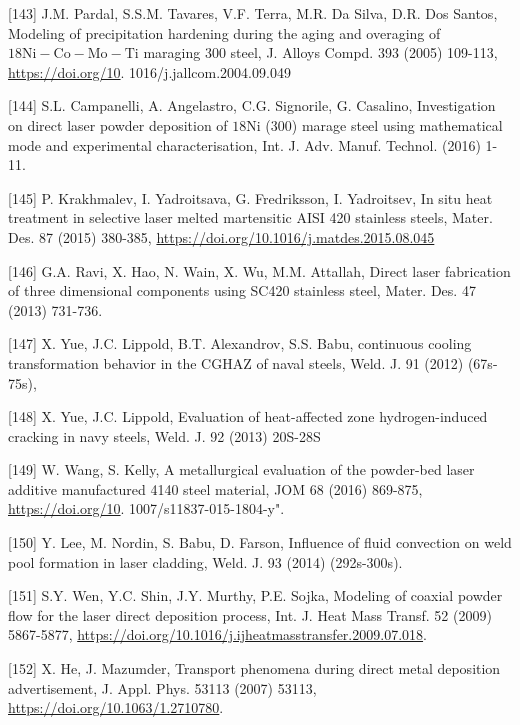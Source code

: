 \documentclass[10pt]{article}
\begin{document}
[143] J.M. Pardal, S.S.M. Tavares, V.F. Terra, M.R. Da Silva, D.R. Dos Santos, Modeling of precipitation hardening during the aging and overaging of $18 \mathrm{Ni}-\mathrm{Co}-\mathrm{Mo}-\mathrm{Ti}$ maraging 300 steel, J. Alloys Compd. 393 (2005) 109-113, \href{https://doi.org/10}{https://doi.org/10}. 1016/j.jallcom.2004.09.049

[144] S.L. Campanelli, A. Angelastro, C.G. Signorile, G. Casalino, Investigation on direct laser powder deposition of $18 \mathrm{Ni}$ (300) marage steel using mathematical mode and experimental characterisation, Int. J. Adv. Manuf. Technol. (2016) 1-11.

[145] P. Krakhmalev, I. Yadroitsava, G. Fredriksson, I. Yadroitsev, In situ heat treatment in selective laser melted martensitic AISI 420 stainless steels, Mater. Des. 87 (2015) 380-385, \href{https://doi.org/10.1016/j.matdes.2015.08.045}{https://doi.org/10.1016/j.matdes.2015.08.045}

[146] G.A. Ravi, X. Hao, N. Wain, X. Wu, M.M. Attallah, Direct laser fabrication of three dimensional components using SC420 stainless steel, Mater. Des. 47 (2013) 731-736.

[147] X. Yue, J.C. Lippold, B.T. Alexandrov, S.S. Babu, continuous cooling transformation behavior in the CGHAZ of naval steels, Weld. J. 91 (2012) (67s-75s),

[148] X. Yue, J.C. Lippold, Evaluation of heat-affected zone hydrogen-induced cracking in navy steels, Weld. J. 92 (2013) 20S-28S

[149] W. Wang, S. Kelly, A metallurgical evaluation of the powder-bed laser additive manufactured 4140 steel material, JOM 68 (2016) 869-875, \href{https://doi.org/10}{https://doi.org/10}. 1007/s11837-015-1804-y".

[150] Y. Lee, M. Nordin, S. Babu, D. Farson, Influence of fluid convection on weld pool formation in laser cladding, Weld. J. 93 (2014) (292s-300s).

[151] S.Y. Wen, Y.C. Shin, J.Y. Murthy, P.E. Sojka, Modeling of coaxial powder flow for the laser direct deposition process, Int. J. Heat Mass Transf. 52 (2009) 5867-5877, \href{https://doi.org/10.1016/j.ijheatmasstransfer.2009.07.018}{https://doi.org/10.1016/j.ijheatmasstransfer.2009.07.018}.

[152] X. He, J. Mazumder, Transport phenomena during direct metal deposition advertisement, J. Appl. Phys. 53113 (2007) 53113, \href{https://doi.org/10.1063/1.2710780}{https://doi.org/10.1063/1.2710780}.
\end{document}
